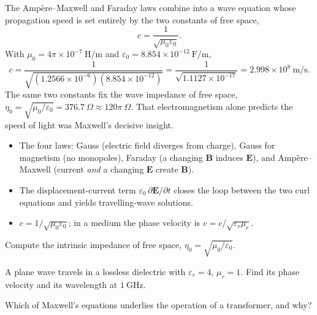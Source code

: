 \begin{workedexample}
The Amp\`ere--Maxwell and Faraday laws combine into a wave equation whose
propagation speed is set entirely by the two constants of free space,
\[ c = \frac{1}{\sqrt{\mu_0 \varepsilon_0}} . \]
With $\mu_0 = 4\pi\times10^{-7}\ \mathrm{H/m}$ and
$\varepsilon_0 = 8.854\times10^{-12}\ \mathrm{F/m}$,
\[ c = \frac{1}{\sqrt{(1.2566\times10^{-6})(8.854\times10^{-12})}}
     = \frac{1}{\sqrt{1.1127\times10^{-17}}}
     = 2.998\times10^{8}\ \mathrm{m/s}. \]
The same two constants fix the wave impedance of free space,
$\eta_0 = \sqrt{\mu_0/\varepsilon_0} = 376.7\ \Omega \approx 120\pi\ \Omega$.
That electromagnetism alone predicts the speed of light was Maxwell's decisive
insight.
\end{workedexample}

\begin{keytakeaways}
\begin{itemize}[leftmargin=1.4em,itemsep=2pt]
\item The four laws: Gauss (electric field diverges from charge), Gauss for
magnetism (no monopoles), Faraday (a changing $\mathbf{B}$ induces $\mathbf{E}$),
and Amp\`ere--Maxwell (current \emph{and} a changing $\mathbf{E}$ create $\mathbf{B}$).
\item The displacement-current term $\varepsilon_0\,\partial\mathbf{E}/\partial t$ closes the
loop between the two curl equations and yields travelling-wave solutions.
\item $c = 1/\sqrt{\mu_0\varepsilon_0}$; in a medium the phase velocity is
$v = c/\sqrt{\varepsilon_r\mu_r}$.
\end{itemize}
\end{keytakeaways}

\begin{exercises}
\item Compute the intrinsic impedance of free space, $\eta_0 = \sqrt{\mu_0/\varepsilon_0}$.
\item A plane wave travels in a lossless dielectric with $\varepsilon_r = 4$, $\mu_r = 1$.
Find its phase velocity and its wavelength at $1\ \mathrm{GHz}$.
\item Which of Maxwell's equations underlies the operation of a transformer, and why?
\end{exercises}

